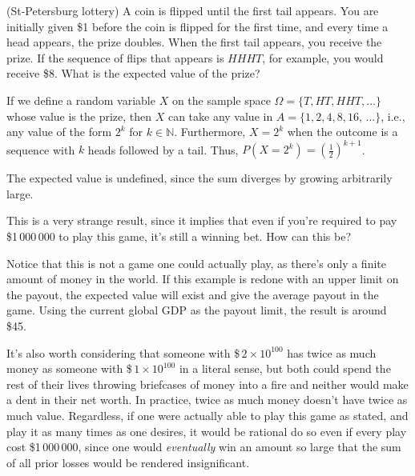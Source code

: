 \begin{examp}
(St-Petersburg lottery) A coin is flipped until the first tail appears. You are initially given \$1 before the coin is flipped for the first time, and every time a head appears, the prize doubles. When the first tail appears, you receive the prize. If the sequence of flips that appears is $HHHT$, for example, you would receive \$8. What is the expected value of the prize?
\par
\noindent If we define a random variable $X$ on the sample space $\Omega = \{T, HT, HHT, ...\}$ whose value is the prize, then $X$ can take any value in $A = \{1,2,4,8,16, \,...\}$, i.e., any value of the form $2^k$ for $k \in \mathbb{N}$. Furthermore, $X = 2^k$ when the outcome is a sequence with $k$ heads followed by a tail. Thus, $P(X = 2^k) = \left(\frac{1}{2}\right)^{k+1}$.
\par
\noindent The expected value is undefined, since the sum diverges by growing arbitrarily large. 
\end{examp}
\par
This is a very strange result, since it implies that even if you're required to pay \$1\,000\,000 to play this game, it's still a winning bet. How can this be?
\par
Notice that this is not a game one could actually play, as there's only a finite amount of money in the world. If this example is redone with an upper limit on the payout, the expected value will exist and give the average payout in the game. Using the current global GDP as the payout limit, the result is around \$45.
\par
It's also worth considering that someone with \$\,$2 \times 10^{100}$ has twice as much money as someone with \$\,$1 \times 10^{100}$ in a literal sense, but both could spend the rest of their lives throwing briefcases of money into a fire and neither would make a dent in their net worth. In practice, twice as much money doesn't have twice as much value. Regardless, if one were actually able to play this game as stated, and play it as many times as one desires, it would be rational do so even if every play cost \$1\,000\,000, since one would \emph{eventually} win an amount so large that the sum of all prior losses would be rendered insignificant. 

